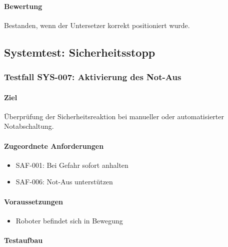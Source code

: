 \documentclass[
  a4paper,
  12pt,
  DIV=12,        %
  parskip=half,  %
  headings=small %
]{scrartcl}
\theoremstyle{definition}
\providecommand{\tightlist}{%
  \setlength{\itemsep}{0pt}\setlength{\parskip}{0pt}}
\theoremstyle{definition}
\begin{document}
\paragraph{Bewertung}\label{bewertung-29}

Bestanden, wenn der Untersetzer korrekt positioniert wurde.

\subsection{Systemtest:
Sicherheitsstopp}\label{systemtest-sicherheitsstopp}

\subsubsection{Testfall SYS-007: Aktivierung des
Not-Aus}\label{testfall-sys-007-aktivierung-des-not-aus}

\paragraph{Ziel}\label{ziel-30}

Überprüfung der Sicherheitsreaktion bei manueller oder automatisierter
Notabschaltung.

\paragraph{Zugeordnete
Anforderungen}\label{zugeordnete-anforderungen-30}

\begin{itemize}
\tightlist
\item
  SAF-001: Bei Gefahr sofort anhalten
\item
  SAF-006: Not-Aus unterstützen
\end{itemize}

\paragraph{Voraussetzungen}\label{voraussetzungen-29}

\begin{itemize}
\tightlist
\item
  Roboter befindet sich in Bewegung
\end{itemize}

\paragraph{Testaufbau}\label{testaufbau-6}
\end{document}
